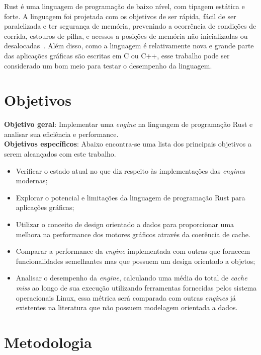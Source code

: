 \documentclass[11pt]{article}
\begin{document}
Rust é uma linguagem de programação de baixo nível, com tipagem estática e forte. A linguagem foi projetada com os objetivos 
de ser rápida, fácil de ser paralelizada e ter segurança de memória, prevenindo a ocorrência de condições de corrida, estouros 
de pilha, e acessos a posições de memória não inicializadas ou desalocadas~\cite{Matsakis:2014:RL:2692956.2663188}. Além disso, 
como a linguagem é relativamente nova e grande parte das aplicações gráficas são escritas em C ou C++, esse trabalho pode ser 
considerado um bom meio para testar o desempenho da linguagem.

\section{Objetivos}
\label{obj}

\textbf{Objetivo geral}: Implementar uma \textit{engine} na linguagem de programação Rust e analisar sua eficiência e performance.\\

\noindent\textbf{Objetivos específicos}: 
Abaixo encontra-se uma lista dos principais objetivos a serem alcançados com este trabalho.
\begin{itemize}
    \item Verificar o estado atual no que diz respeito às implementações das \textit{engine}s modernas;
    \item Explorar o potencial e limitações da linguagem de programação Rust para aplicações gráficas;
    \item Utilizar o conceito de design orientado a dados para proporcionar uma melhora
        na performance dos motores gráficos através da coerência de cache.
    \item Comparar a performance da \textit{engine} implementada com outras que fornecem funcionalidades semelhantes mas
        que possuem um design orientado a objetos;
    \item Analisar o desempenho da \textit{engine}, calculando uma média do total de \textit{cache miss} ao longo de sua 
        execução utilizando ferramentas fornecidas pelos sistema operacionais Linux, essa métrica será comparada com outras
        \textit{engines} já existentes na literatura que não possuem modelagem orientada a dados.
\end{itemize}

\section{Metodologia}
\label{met}
\end{document}
